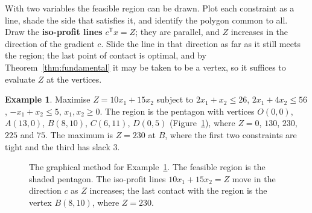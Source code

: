 \documentclass[11pt,a4paper]{article}
\numberwithin{equation}{section}
\theoremstyle{definition}
\newtheorem{exa}[thm]{Example}
\begin{document}
With two variables the feasible region can be drawn. Plot each constraint as a line, shade the side that satisfies it, and identify the polygon common to all. Draw the \textbf{iso-profit lines} $c^{\mathsf T}x = Z$; they are parallel, and $Z$ increases in the direction of the gradient $c$. Slide the line in that
direction as far as it still meets the region; the last point of contact is optimal, and by Theorem~\ref{thm:fundamental} it may be taken to be a vertex, so it suffices to evaluate $Z$ at the vertices.

\begin{exa}
\label{ex:graphical}
Maximise $Z = 10x_1 + 15x_2$ subject to $2x_1 + x_2 \leq 26$, $2x_1 + 4x_2 \leq 56$, $-x_1 + x_2 \leq 5$, $x_1, x_2 \geq 0$. The region is the pentagon with vertices $O(0, 0)$, $A(13, 0)$, $B(8, 10)$, $C(6, 11)$, $D(0, 5)$ (Figure~\ref{fig:graphical}), where $Z = 0$, $130$, $230$, $225$ and $75$. The maximum is
$Z = 230$ at $B$, where the first two constraints are tight and the third has slack $3$.
\end{exa}

\begin{figure}[H]
\centering
{}
\caption{The graphical method for Example~\ref{ex:graphical}. The feasible region is the shaded pentagon. The iso-profit lines $10x_1 + 15x_2 = Z$ move in the direction $c$ as $Z$ increases; the last contact with the region is the vertex $B(8, 10)$, where $Z = 230$.}
\label{fig:graphical}
\end{figure}
\end{document}

